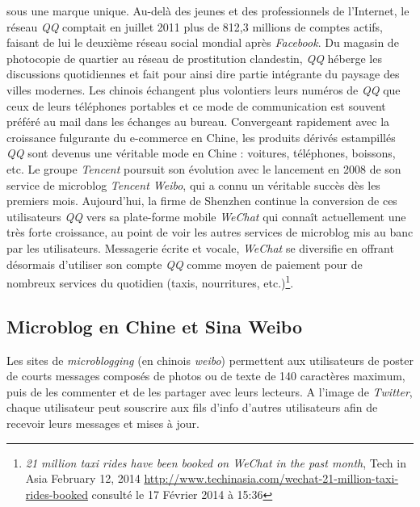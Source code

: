 sous une marque unique. Au-delà des jeunes et des professionnels de l’Internet, le réseau \textit{QQ} comptait en juillet 2011 plus de 812,3 millions de comptes actifs, faisant de lui le deuxième réseau social mondial après \textit{Facebook}. Du magasin de photocopie de quartier au réseau de prostitution clandestin, \textit{QQ} héberge les discussions quotidiennes et fait pour ainsi dire partie intégrante du paysage des villes modernes. Les chinois échangent plus volontiers leurs numéros de \textit{QQ} que ceux de leurs téléphones portables et ce mode de communication est souvent préféré au mail dans les échanges au bureau. Convergeant rapidement avec la croissance fulgurante du e-commerce en Chine, les produits dérivés estampillés \textit{QQ} sont devenus une véritable mode en Chine : voitures, téléphones, boissons, etc. Le groupe \textit{Tencent} poursuit son évolution avec le lancement en 2008 de son service de microblog \textit{Tencent Weibo}, qui a connu un véritable succès dès les premiers mois. Aujourd’hui, la firme de Shenzhen continue la conversion de ces utilisateurs \textit{QQ} vers sa plate-forme mobile \textit{WeChat} qui connaît actuellement une très forte croissance, au point de voir les autres services de microblog mis au banc par les utilisateurs. Messagerie écrite et vocale, \textit{WeChat} se diversifie en offrant désormais d’utiliser son compte \textit{QQ} comme moyen de paiement pour de nombreux services du quotidien (taxis, nourritures, etc.)\footnote{\textit{21 million taxi rides have been booked on WeChat in the past month}, Tech in Asia February 12, 2014 \url{http://www.techinasia.com/wechat-21-million-taxi-rides-booked} consulté le 17 Février 2014 à 15:36}.

\subsection[Microblog en Chine et Sina Weibo]{Microblog en Chine et Sina Weibo}
Les sites de \textit{microblogging} (en chinois \textit{weibo}) permettent aux utilisateurs de poster de courts messages composés de photos ou de texte de 140 caractères maximum, puis de les commenter et de les partager avec leurs lecteurs. A l’image de \textit{Twitter}, chaque utilisateur peut souscrire aux fils d’info d’autres utilisateurs afin de recevoir leurs messages et mises à jour.

